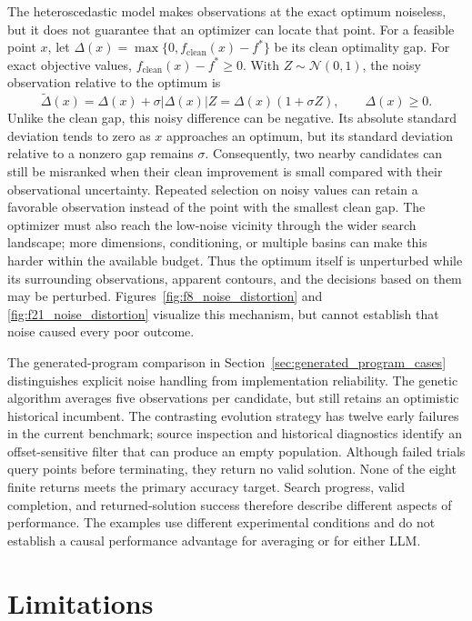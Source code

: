 The heteroscedastic model makes observations at the exact optimum noiseless,
but it does not guarantee that an optimizer can locate that point. For a feasible point $x$, let
$\Delta(x)=\max\{0,f_{\mathrm{clean}}(x)-f^*\}$ be its clean optimality
gap. For exact objective values, $f_{\mathrm{clean}}(x)-f^*\geq0$. With
$Z\sim\mathcal N(0,1)$, the noisy observation relative to the optimum is
\begin{equation}
    \widetilde\Delta(x)=\Delta(x)+\sigma|\Delta(x)|Z
    =\Delta(x)(1+\sigma Z), \qquad \Delta(x)\geq 0.
    \label{eq:experiment_relative_noise}
\end{equation}
Unlike the clean gap, this noisy difference can be negative.
Its absolute standard deviation tends to zero as $x$ approaches an optimum,
but its standard deviation relative to a nonzero gap remains $\sigma$.
Consequently, two nearby candidates can still be misranked when their
clean improvement is small compared with their observational uncertainty.
Repeated selection on noisy values can retain a favorable observation
instead of the point with the smallest clean gap. The optimizer must also
reach the low-noise vicinity through the wider search landscape; more
dimensions, conditioning, or multiple basins can make this harder within
the available budget. Thus the optimum itself is unperturbed while its
surrounding observations, apparent contours, and the decisions based on
them may be perturbed. Figures~\ref{fig:f8_noise_distortion} and
\ref{fig:f21_noise_distortion} visualize this mechanism, but cannot
establish that noise caused every poor outcome.

The generated-program comparison in
Section~\ref{sec:generated_program_cases} distinguishes explicit noise
handling from implementation reliability. The genetic algorithm averages
five observations per candidate, but still retains an optimistic historical
incumbent. The contrasting evolution strategy has twelve early failures
in the current benchmark; source inspection and historical diagnostics
identify an offset-sensitive filter that can produce an empty population.
Although failed trials query points before terminating, they return no
valid solution. None of the eight finite returns meets the primary
accuracy target. Search progress, valid completion, and returned-solution
success therefore describe different aspects of performance. The examples
use different experimental conditions and do not establish a causal
performance advantage for averaging or for either LLM.

\section{Limitations}
\label{sec:discussion_limitations}

